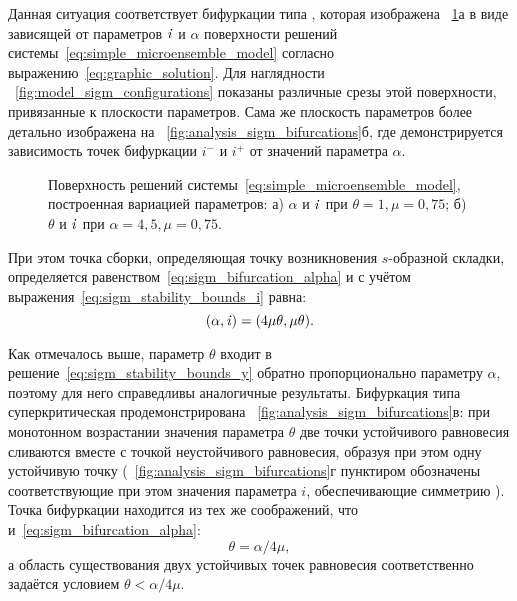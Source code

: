 Данная ситуация соответствует бифуркации типа , которая изображена \onfigure~\ref{fig:analysis_sigm_solution_surface}а в виде зависящей от параметров $\mathit{i}$ и $\alpha$ поверхности решений системы~\eqref{eq:simple_microensemble_model} согласно выражению~\eqref{eq:graphic_solution}. Для наглядности \onfigure~\ref{fig:model_sigm_configurations} показаны различные срезы этой поверхности, привязанные к плоскости параметров. Сама же плоскость параметров более детально изображена на \onfigure~\ref{fig:analysis_sigm_bifurcations}б, где демонстрируется зависимость точек бифуркации $i^{-}$ и $i^{+}$ от значений параметра $\alpha$. 
\begin{figure}[ht]
    \caption{Поверхность решений системы~\eqref{eq:simple_microensemble_model}, построенная вариацией параметров: а) $\alpha$ и $\mathit{i}$ при $\theta = 1, \mu = 0,75$; б) $\theta$ и $\mathit{i}$ при $\alpha = 4,5, \mu = 0,75$.}
    \label{fig:analysis_sigm_solution_surface}
\end{figure}
При этом \socalled точка сборки, определяющая точку возникновения $s$-образной складки, определяется равенством~\eqref{eq:sigm_bifurcation_alpha} и с учётом выражения~\eqref{eq:sigm_stability_bounds_i} равна:
\begin{equation}
    \nonumber
    (\alpha, \mathit{i}) = (4 \mu \theta, \mu \theta).
\end{equation}

Как отмечалось выше, параметр $\theta$ входит в решение~\eqref{eq:sigm_stability_bounds_y} обратно пропорционально параметру $\alpha$, поэтому для него справедливы аналогичные результаты. Бифуркация типа суперкритическая  продемонстрирована \onfigure~\ref{fig:analysis_sigm_bifurcations}в: при монотонном возрастании значения параметра $\theta$ две точки устойчивого равновесия сливаются вместе с точкой неустойчивого равновесия, образуя при этом одну устойчивую точку (\onfigure~\ref{fig:analysis_sigm_bifurcations}г пунктиром обозначены соответствующие при этом значения параметра $i$, обеспечивающие симметрию ). Точка бифуркации находится из тех же соображений, что и~\eqref{eq:sigm_bifurcation_alpha}:
\begin{equation}
    \label{eq:sigm_bifurcation_theta}
    \theta =  \alpha / 4 \mu,
\end{equation}
а область существования двух устойчивых точек равновесия соответственно задаётся условием $\theta < \alpha / 4 \mu$.


